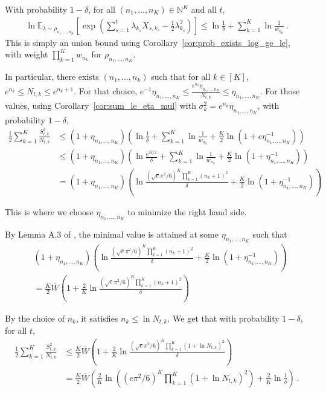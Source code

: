 With probability $1 - \delta$, for all $(n_1, \ldots, n_K) \in \mathbb{N}^K$ and all $t$,
\begin{align*}
\ln \mathbb{E}_{\lambda \sim \rho_{n_1, \ldots, n_K}}\left[\exp\left(\sum_{s=1}^t \lambda_{k_s}X_{s,k_s} - \frac{1}{2}\lambda_{k_s}^2\right)\right]
\le \ln \frac{1}{\delta} + \sum_{k=1}^K \ln \frac{1}{w_{n_k}}
\: .
\end{align*}
This is simply an union bound using Corollary~\ref{cor:prob_exists_log_ge_le}, with weight $\prod_{k=1}^K w_{n_k}$ for $\rho_{n_1, \ldots, n_K}$.

In particular, there exists $(n_1, \ldots, n_k)$ such that for all $k \in [K]$, $e^{n_k} \le N_{t,k} \le e^{n_k+1}$.
For that choice, $e^{-1}\eta_{n_1, \ldots, n_K} \le \frac{e^{n_k}\eta_{n_1, \ldots, n_K}}{N_{t,k}} \le \eta_{n_1, \ldots, n_K}$.
For those values, using Corollary~\ref{cor:sum_le_eta_mul} with $\sigma_k^2 = e^{n_k}\eta_{n_1, \ldots, n_K}$, with probability $1 - \delta$,
\begin{align*}
\frac{1}{2} \sum_{k=1}^K \frac{S_{t,k}^2}{N_{t,k}}
&\le (1 + \eta_{n_1, \ldots, n_K}) \left(\ln \frac{1}{\delta} + \sum_{k=1}^K \ln \frac{1}{w_{n_k}}
  + \frac{K}{2}\ln(1 + e \eta_{n_1, \ldots, n_K}^{-1})\right)
\\
&\le (1 + \eta_{n_1, \ldots, n_K}) \left(\ln \frac{e^{K/2}}{\delta} + \sum_{k=1}^K \ln \frac{1}{w_{n_k}}
  + \frac{K}{2}\ln(1 + \eta_{n_1, \ldots, n_K}^{-1})\right)
\\
&= (1 + \eta_{n_1, \ldots, n_K}) \left(\ln \frac{(\sqrt{e}\pi^2/6)^K \prod_{k=1}^K (n_k+1)^2}{\delta}
  + \frac{K}{2}\ln(1 + \eta_{n_1, \ldots, n_K}^{-1})\right)
\end{align*}

This is where we choose $\eta_{n_1, \ldots, n_K}$ to minimize the right hand side.

By Lemma A.3 of \citep{degenneImpactStructureDesign2019}, the minimal value is attained at some $\eta_{n_1, \ldots, n_K}$ such that
\begin{align*}
&(1 + \eta_{n_1, \ldots, n_K}) \left(\ln \frac{(\sqrt{e}\pi^2/6)^K \prod_{k=1}^K (n_k+1)^2}{\delta}
  + \frac{K}{2}\ln(1 + \eta_{n_1, \ldots, n_K}^{-1})\right)
\\
&= \frac{K}{2} \overline{W}\left( 1 + \frac{2}{K}\ln \frac{(\sqrt{e}\pi^2/6)^K \prod_{k=1}^K (n_k+1)^2}{\delta}\right)
\end{align*}

By the choice of $n_k$, it satisfies $n_k \le \ln N_{t,k}$.
We get that with probability $1 - \delta$, for all $t$,
\begin{align*}
\frac{1}{2} \sum_{k=1}^K \frac{S_{t,k}^2}{N_{t,k}}
&\le \frac{K}{2} \overline{W}\left( 1 + \frac{2}{K}\ln \frac{(\sqrt{e}\pi^2/6)^K \prod_{k=1}^K (1 + \ln N_{t,k})^2}{\delta}\right)
\\
&= \frac{K}{2} \overline{W}\left(\frac{2}{K}\ln \left((e\pi^2/6)^K \prod_{k=1}^K (1 + \ln N_{t,k})^2\right) + \frac{2}{K}\ln \frac{1}{\delta}\right)
\: .
\end{align*}

